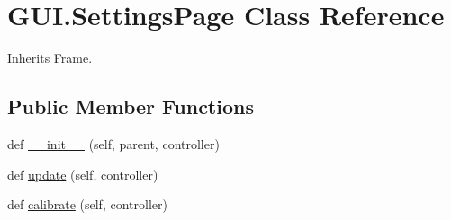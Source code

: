 \hypertarget{class_g_u_i_1_1_settings_page}{}\section{G\+U\+I.\+Settings\+Page Class Reference}
\label{class_g_u_i_1_1_settings_page}


Inherits Frame.

\subsection*{Public Member Functions}
\begin{DoxyCompactItemize}
\item 
def \mbox{\hyperlink{class_g_u_i_1_1_settings_page_ac0a857a6f98b6e7323e45ad98d33d524}{\+\_\+\+\_\+init\+\_\+\+\_\+}} (self, parent, controller)
\item 
def \mbox{\hyperlink{class_g_u_i_1_1_settings_page_a58dd7d2be050facf80c8d01dd6dc002a}{update}} (self, controller)
\item 
def \mbox{\hyperlink{class_g_u_i_1_1_settings_page_af63ab2ad5c435dd299760591bc65f642}{calibrate}} (self, controller)
\end{DoxyCompactItemize}
